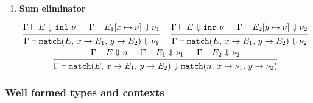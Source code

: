 \documentclass{article}
\begin{document}
\begin{enumerate}
  \item \textbf{Sum eliminator}
  \begin{spreadlines}{2em}
  \begin{gather*}
    \begin{prooftree}
      \hypo{\Gamma \vdash E \Downarrow \inl \,\, \nu}
      \hypo{\Gamma \vdash E_1[x \mapsto \nu] \Downarrow \nu_1}
      \infer2{\Gamma \vdash 
        \match(E, \, x \rightarrow E_1, \, y \rightarrow E_2)
        \Downarrow \nu_1}
    \end{prooftree}  
    ~ \quad
   \begin{prooftree}
     \hypo{\Gamma \vdash E \Downarrow \inr \,\, \nu}
     \hypo{\Gamma \vdash E_2[y \mapsto \nu] \Downarrow \nu_2}
     \infer2{\Gamma \vdash 
       \match(E, \, x \rightarrow E_1, \, y \rightarrow E_2)
       \Downarrow \nu_2}
   \end{prooftree}  
   \\
   \begin{prooftree}
    \hypo{\Gamma \vdash E \Downarrow n}
      \hypo{\Gamma \vdash E_1 \Downarrow \nu_1}
      \hypo{\Gamma \vdash E_2 \Downarrow \nu_2}
      \infer3{\Gamma \vdash \match(E, \, x \rightarrow E_1, \, y \rightarrow E_2) 
               \Downarrow
               \match(n, \, x \rightarrow \nu_1, \, y \rightarrow \nu_2) 
               }
   \end{prooftree}  
  \end{gather*}
\end{spreadlines}

\end{enumerate}


\subsubsection{Well formed types and contexts}

\end{document}
